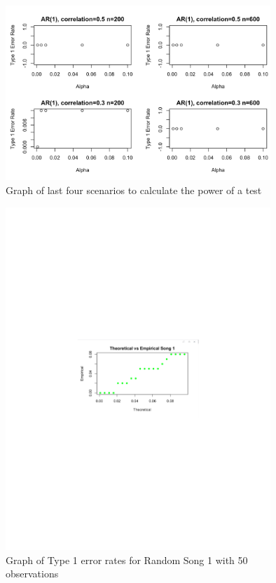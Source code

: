 \documentclass[12pt, letterpaper]{article}
\begin{document}
\begin{figure}[!hb]
\centering
\includegraphics[width=10cm]{AR_correlationPlots.png}
\caption{Graph of last four scenarios to calculate the power of a test}
\label{fig: Power Graphs 2}
\end{figure}

\begin{figure}[!hb]
\centering
\includegraphics[width=10cm]{PowerGraph_nonparamboot.pdf}
\caption{Graph of Type 1 error rates for Random Song 1 with 50 observations}
\label{fig: Type 1 Error, Song 1, n=50}
\end{figure}
\end{document}
